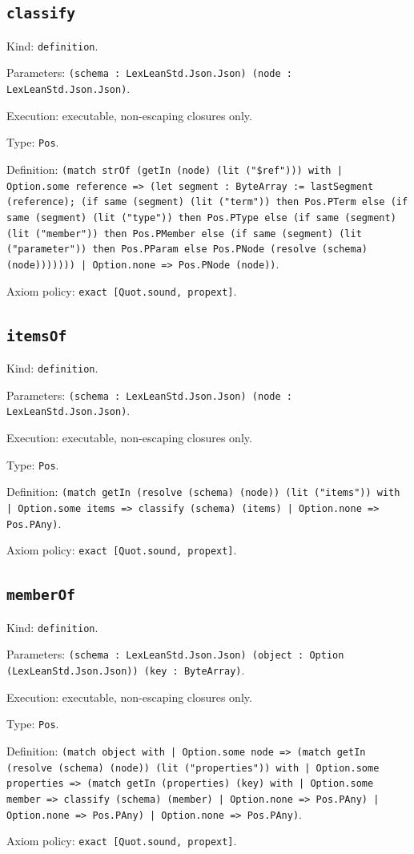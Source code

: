 \documentclass[11pt]{article}
\begin{document}
\subsection*{\texttt{classify}}
\noindent Kind: \texttt{definition}.\par
\noindent Parameters: \texttt{(schema : LexLeanStd.Json.Json) (node : LexLeanStd.Json.Json)}.\par
\noindent Execution: executable, non-escaping closures only.\par
\noindent Type: \texttt{Pos}.\par
\noindent Definition: \texttt{(match strOf (getIn (node) (lit ("\$ref"))) with | Option.some reference => (let segment : ByteArray := lastSegment (reference); (if same (segment) (lit ("term")) then Pos.PTerm else (if same (segment) (lit ("type")) then Pos.PType else (if same (segment) (lit ("member")) then Pos.PMember else (if same (segment) (lit ("parameter")) then Pos.PParam else Pos.PNode (resolve (schema) (node))))))) | Option.none => Pos.PNode (node))}.\par
\noindent Axiom policy: \texttt{exact [Quot.sound, propext]}.\par
\subsection*{\texttt{itemsOf}}
\noindent Kind: \texttt{definition}.\par
\noindent Parameters: \texttt{(schema : LexLeanStd.Json.Json) (node : LexLeanStd.Json.Json)}.\par
\noindent Execution: executable, non-escaping closures only.\par
\noindent Type: \texttt{Pos}.\par
\noindent Definition: \texttt{(match getIn (resolve (schema) (node)) (lit ("items")) with | Option.some items => classify (schema) (items) | Option.none => Pos.PAny)}.\par
\noindent Axiom policy: \texttt{exact [Quot.sound, propext]}.\par
\subsection*{\texttt{memberOf}}
\noindent Kind: \texttt{definition}.\par
\noindent Parameters: \texttt{(schema : LexLeanStd.Json.Json) (object : Option (LexLeanStd.Json.Json)) (key : ByteArray)}.\par
\noindent Execution: executable, non-escaping closures only.\par
\noindent Type: \texttt{Pos}.\par
\noindent Definition: \texttt{(match object with | Option.some node => (match getIn (resolve (schema) (node)) (lit ("properties")) with | Option.some properties => (match getIn (properties) (key) with | Option.some member => classify (schema) (member) | Option.none => Pos.PAny) | Option.none => Pos.PAny) | Option.none => Pos.PAny)}.\par
\noindent Axiom policy: \texttt{exact [Quot.sound, propext]}.\par
\end{document}

